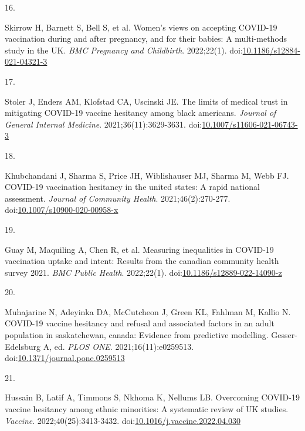 \documentclass[
]{article}
\newlength{\cslhangindent}
\newlength{\csllabelwidth}
\newlength{\cslentryspacingunit} %
\newenvironment{CSLReferences}[2] %
 {%
  \setlength{\parindent}{0pt}
  \ifodd #1
  \let\oldpar\par
  \def\par{\hangindent=\cslhangindent\oldpar}
  \fi
  \setlength{\parskip}{#2\cslentryspacingunit}
 }%
 {}
\newcommand{\CSLLeftMargin}[1]{\parbox[t]{\csllabelwidth}{#1}}
\newcommand{\CSLRightInline}[1]{\parbox[t]{\linewidth - \csllabelwidth}{#1}\break}
\begin{document}
\begin{CSLReferences}{0}{0}
\leavevmode{}%
\CSLLeftMargin{16. }%
\CSLRightInline{Skirrow H, Barnett S, Bell S, et al. Women's views on
accepting {COVID}-19 vaccination during and after pregnancy, and for
their babies: A multi-methods study in the {UK}. \emph{{BMC} Pregnancy
and Childbirth}. 2022;22(1).
doi:\href{https://doi.org/10.1186/s12884-021-04321-3}{10.1186/s12884-021-04321-3}}

\leavevmode{}%
\CSLLeftMargin{17. }%
\CSLRightInline{Stoler J, Enders AM, Klofstad CA, Uscinski JE. The
limits of medical trust in mitigating {COVID}-19 vaccine hesitancy among
black americans. \emph{Journal of General Internal Medicine}.
2021;36(11):3629-3631.
doi:\href{https://doi.org/10.1007/s11606-021-06743-3}{10.1007/s11606-021-06743-3}}

\leavevmode{}%
\CSLLeftMargin{18. }%
\CSLRightInline{Khubchandani J, Sharma S, Price JH, Wiblishauser MJ,
Sharma M, Webb FJ. {COVID}-19 vaccination hesitancy in the united
states: A rapid national assessment. \emph{Journal of Community Health}.
2021;46(2):270-277.
doi:\href{https://doi.org/10.1007/s10900-020-00958-x}{10.1007/s10900-020-00958-x}}

\leavevmode{}%
\CSLLeftMargin{19. }%
\CSLRightInline{Guay M, Maquiling A, Chen R, et al. Measuring
inequalities in {COVID}-19 vaccination uptake and intent: Results from
the canadian community health survey 2021. \emph{{BMC} Public Health}.
2022;22(1).
doi:\href{https://doi.org/10.1186/s12889-022-14090-z}{10.1186/s12889-022-14090-z}}

\leavevmode{}%
\CSLLeftMargin{20. }%
\CSLRightInline{Muhajarine N, Adeyinka DA, McCutcheon J, Green KL,
Fahlman M, Kallio N. {COVID}-19 vaccine hesitancy and refusal and
associated factors in an adult population in saskatchewan, canada:
Evidence from predictive modelling. Gesser-Edelsburg A, ed. \emph{{PLOS}
{ONE}}. 2021;16(11):e0259513.
doi:\href{https://doi.org/10.1371/journal.pone.0259513}{10.1371/journal.pone.0259513}}

\leavevmode{}%
\CSLLeftMargin{21. }%
\CSLRightInline{Hussain B, Latif A, Timmons S, Nkhoma K, Nellums LB.
Overcoming {COVID}-19 vaccine hesitancy among ethnic minorities: A
systematic review of {UK} studies. \emph{Vaccine}.
2022;40(25):3413-3432.
doi:\href{https://doi.org/10.1016/j.vaccine.2022.04.030}{10.1016/j.vaccine.2022.04.030}}


\end{CSLReferences}
\end{document}
